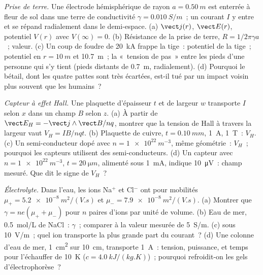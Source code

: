 \begin{exercise}[$\star\star\star$]\label{exo:b2:charges-currents-conduction:10}
\emph{Prise de terre.} Une électrode hémisphérique de rayon $a = \qty{0.50}{m}$
est enterrée à fleur de sol dans une terre de conductivité $\gamma =
\qty{0.010}{S/m}$~; un courant $I$ y entre et se répand radialement dans le
demi-espace. (a) $\vect j(r)$, $\vect E(r)$, potentiel $V(r)$ avec $V(\infty) = 0$.
(b) Résistance de la prise de terre, $R = 1/2\pi\gamma a$~; valeur. (c) Un
coup de foudre de \qty{20}{kA} frappe la tige~: potentiel de la tige~;
potentiel en $r = \qty{10}{m}$ et \qty{10.7}{m}~; la «~tension de pas~» entre
les pieds d'une personne qui s'y tient (pieds distants de \qty{0.7}{m}, radialement).
(d) Pourquoi le bétail, dont les quatre pattes sont très écartées, est-il tué par un
impact voisin plus souvent que les humains~?
\end{exercise}

\begin{exercise}[$\star\star\star$]\label{exo:b2:charges-currents-conduction:11}
\emph{Capteur à effet Hall.} Une plaquette d'épaisseur $t$ et de largeur $w$ transporte $I$
selon $x$ dans un champ $B$ selon $z$. (a) À partir de $\vect E_H = -\vect j\wedge\vect B
/nq$, montrer que la tension de Hall à travers la largeur vaut $V_H = IB/nqt$. (b)
Plaquette de cuivre, $t = \qty{0.10}{mm}$, \qty{1}{A}, \qty{1}{T}~: $V_H$. (c) Un
semi-conducteur dopé avec $n = \qty{1e22}{m^{-3}}$, même géométrie~: $V_H$~; pourquoi les
capteurs utilisent des semi-conducteurs. (d) Un capteur avec $n = \qty{1e22}{m^{-3}}$, $t =
\qty{20}{\micro m}$, alimenté sous \qty{1}{mA}, indique \qty{10}{\micro V}~: champ mesuré.
Que dit le signe de $V_H$~?
\end{exercise}

\begin{exercise}[$\star\star\star$]\label{exo:b2:charges-currents-conduction:12}
\emph{Électrolyte.} Dans l'eau, les ions Na$^+$ et Cl$^-$ ont pour mobilités
$\mu_+ = \qty{5.2e-8}{m^2/(V.s)}$ et $\mu_- = \qty{7.9e-8}{m^2/(V.s)}$. (a)
Montrer que $\gamma = ne(\mu_+ + \mu_-)$ pour $n$ paires d'ions par unité de volume.
(b) Eau de mer, \qty{0.5}{mol/L} de NaCl~: $\gamma$~; comparer à la valeur mesurée de
\qty{5}{S/m}. (c)  sous \qty{10}{V/m}~; quel ion transporte la plus grande part
du courant~? (d) Une colonne d'eau de mer, \qty{1}{cm^2} sur \qty{10}{cm}, transporte
\qty{1}{A}~: tension, puissance, et temps pour l'échauffer de \qty{10}{K} ($c =
\qty{4.0}{kJ/(kg.K)}$)~; pourquoi refroidit-on les gels d'électrophorèse~?
\end{exercise}

